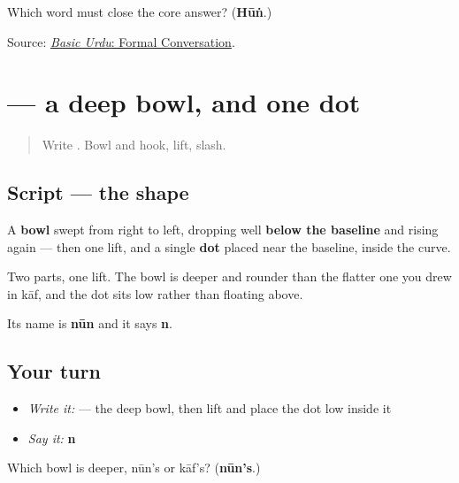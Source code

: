 \begin{tcolorbox}[breakable,colback=teal!4,colframe=teal!35!black,title={Before you move on}]
Which word must close the core answer? (\textbf{Hūṅ}.)

Source: \href{https://openbooks.lib.msu.edu/urdu/chapter/2-4/}{\emph{Basic Urdu}: Formal Conversation}.
\end{tcolorbox}
\section[\texorpdfstring{\ur{ن} (nūn)}{ن (nūn)}]{ — a deep bowl, and one dot}

\label{lesson:UR-W04-nun}



\begin{quote}
Write . Bowl and hook, lift, slash.
\end{quote}

\subsection*{Script — the shape}

\begin{quote}
\end{quote}

A \textbf{bowl} swept from right to left, dropping well \textbf{below the baseline} and rising again — then one lift, and a single \textbf{dot} placed near the baseline, inside the curve.

Two parts, one lift. The bowl is deeper and rounder than the flatter one you drew in kāf, and the dot sits low rather than floating above.

Its name is \textbf{nūn} and it says \textbf{n}.

\subsection*{Your turn}
\begin{itemize}
\raggedright
  \item \emph{Write it:}  — the deep bowl, then lift and place the dot low inside it
  \item \emph{Say it:} \textbf{n}
\end{itemize}

\begin{tcolorbox}[breakable,colback=teal!4,colframe=teal!35!black,title={Before you move on}]
Which bowl is deeper, nūn's or kāf's? (\textbf{nūn's}.)
\end{tcolorbox}
